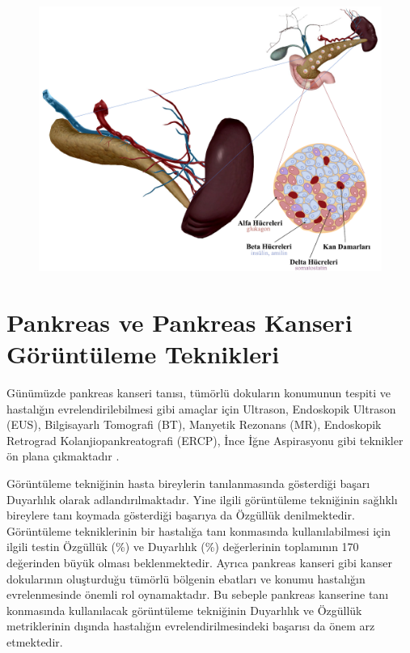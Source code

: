 \begin{figure}[h!]
	\begin{center}
		\vspace{0.4cm}
		{
			\vspace{0.4cm}
			\includegraphics[scale=0.57]{Genel-Bilgiler/Figures/endokrin_function.pdf}
		}
	\end{center}
\end{figure}

\section{Pankreas ve Pankreas Kanseri Görüntüleme Teknikleri}

Günümüzde pankreas kanseri tanısı, tümörlü dokuların konumunun tespiti ve hastalığın evrelendirilebilmesi gibi amaçlar için Ultrason, Endoskopik Ultrason (EUS), Bilgisayarlı Tomografi (BT), Manyetik Rezonans (MR), Endoskopik Retrograd Kolanjiopankreatografi (ERCP), İnce İğne Aspirasyonu gibi teknikler ön plana çıkmaktadır \cite{goral2014pankreas,freelove2006pancreatic,cameron2001pancreatic,chu2017diagnosis}.

Görüntüleme tekniğinin hasta bireylerin tanılanmasında gösterdiği başarı Duyarlılık olarak adlandırılmaktadır. Yine ilgili görüntüleme tekniğinin sağlıklı bireylere tanı koymada gösterdiği başarıya da Özgüllük denilmektedir. Görüntüleme tekniklerinin bir hastalığa tanı konmasında kullanılabilmesi için ilgili testin Özgüllük (\%) ve Duyarlılık (\%) değerlerinin toplamının 170 değerinden büyük olması beklenmektedir. Ayrıca pankreas kanseri gibi kanser dokularının oluşturduğu tümörlü bölgenin ebatları ve konumu hastalığın evrelenmesinde önemli rol oynamaktadır. Bu sebeple pankreas kanserine tanı konmasında kullanılacak görüntüleme tekniğinin Duyarlılık ve Özgüllük metriklerinin dışında hastalığın evrelendirilmesindeki başarısı da önem arz etmektedir.

